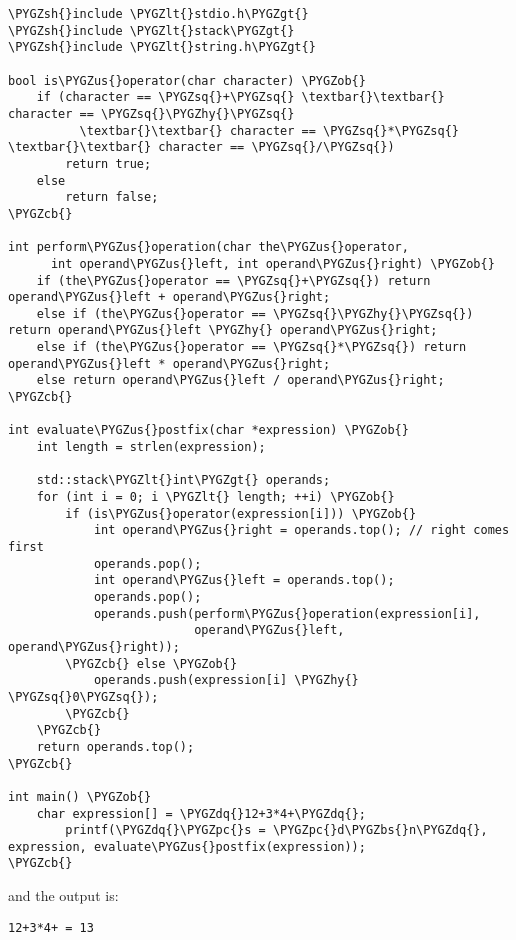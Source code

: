 \documentclass[letterpaper,10pt,english]{sphinxmanual}
\def\PYGZbs{\char`\\}
\def\PYGZus{\char`\_}
\def\PYGZob{\char`\{}
\def\PYGZcb{\char`\}}
\def\PYGZlt{\char`\<}
\def\PYGZgt{\char`\>}
\def\PYGZsh{\char`\#}
\def\PYGZpc{\char`\%}
\def\PYGZhy{\char`\-}
\def\PYGZsq{\char`\'}
\def\PYGZdq{\char`\"}
\renewcommand\PYGZsq{\textquotesingle}
\begin{document}
\begin{Verbatim}[commandchars=\\\{\}]
\PYGZsh{}include \PYGZlt{}stdio.h\PYGZgt{}
\PYGZsh{}include \PYGZlt{}stack\PYGZgt{}
\PYGZsh{}include \PYGZlt{}string.h\PYGZgt{}

bool is\PYGZus{}operator(char character) \PYGZob{}
    if (character == \PYGZsq{}+\PYGZsq{} \textbar{}\textbar{} character == \PYGZsq{}\PYGZhy{}\PYGZsq{}
          \textbar{}\textbar{} character == \PYGZsq{}*\PYGZsq{} \textbar{}\textbar{} character == \PYGZsq{}/\PYGZsq{})
        return true;
    else
        return false;
\PYGZcb{}

int perform\PYGZus{}operation(char the\PYGZus{}operator,
      int operand\PYGZus{}left, int operand\PYGZus{}right) \PYGZob{}
    if (the\PYGZus{}operator == \PYGZsq{}+\PYGZsq{}) return operand\PYGZus{}left + operand\PYGZus{}right;
    else if (the\PYGZus{}operator == \PYGZsq{}\PYGZhy{}\PYGZsq{}) return operand\PYGZus{}left \PYGZhy{} operand\PYGZus{}right;
    else if (the\PYGZus{}operator == \PYGZsq{}*\PYGZsq{}) return operand\PYGZus{}left * operand\PYGZus{}right;
    else return operand\PYGZus{}left / operand\PYGZus{}right;
\PYGZcb{}

int evaluate\PYGZus{}postfix(char *expression) \PYGZob{}
    int length = strlen(expression);

    std::stack\PYGZlt{}int\PYGZgt{} operands;
    for (int i = 0; i \PYGZlt{} length; ++i) \PYGZob{}
        if (is\PYGZus{}operator(expression[i])) \PYGZob{}
            int operand\PYGZus{}right = operands.top(); // right comes first
            operands.pop();
            int operand\PYGZus{}left = operands.top();
            operands.pop();
            operands.push(perform\PYGZus{}operation(expression[i],
                          operand\PYGZus{}left, operand\PYGZus{}right));
        \PYGZcb{} else \PYGZob{}
            operands.push(expression[i] \PYGZhy{} \PYGZsq{}0\PYGZsq{});
        \PYGZcb{}
    \PYGZcb{}
    return operands.top();
\PYGZcb{}

int main() \PYGZob{}
    char expression[] = \PYGZdq{}12+3*4+\PYGZdq{};
        printf(\PYGZdq{}\PYGZpc{}s = \PYGZpc{}d\PYGZbs{}n\PYGZdq{}, expression, evaluate\PYGZus{}postfix(expression));
\PYGZcb{}
\end{Verbatim}

and the output is:

\begin{Verbatim}[commandchars=\\\{\}]
12+3*4+ = 13
\end{Verbatim}
\end{document}
